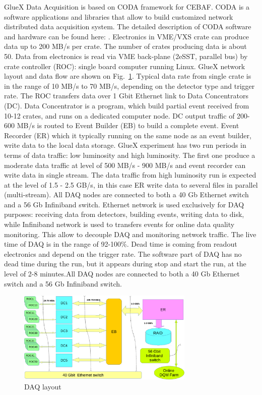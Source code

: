 GlueX Data Acquisition is based on CODA framework for CEBAF. CODA is a software applications and libraries that allow to build customized 
network distributed data acquisition system.
The detailed description of CODA software and hardware can be found here: \cite{CLASS12_DAQ}. 
Electronics in VME/VXS crate can produce data up to 200 MB/s per crate.
The number of crates producing data is about 50.
Data from electronics is read via VME back-plane (2eSST, parallel bus) by crate controller (ROC): single board computer running Linux.
GlueX network layout and data flow are shown on Fig.~\ref{fig:CODA}.
Typical data rate from single crate is in the range of 10 MB/s to 70 MB/s, depending on the detector type and trigger rate.
The ROC transfers data over 1 Gbit Ethernet link to Data Concentrators (DC).
Data Concentrator is a program, which build partial event received from 10-12 crates, and runs on a dedicated computer node.
DC output traffic of 200-600 MB/s is routed to Event Builder (EB) to build a complete event.
Event Recorder (ER) which it typically running on the same node as an event builder, write data to the local data storage. 
GlueX experiment has two run periods in terms of data traffic: low luminosity and high luminosity.
The first one produce a moderate data traffic at level of 500 MB/s - 900 MB/s and event recorder can write data in single stream. 
The data traffic from high luminosity run is expected at the level of 1.5 - 2.5 GB/s, in this case ER write data to several files in parallel (multi-stream).
All DAQ nodes are connected to both a 40 Gb Ethernet switch and a 56 Gb Infiniband switch.
Ethernet network is used exclusively for DAQ purposes: receiving data from detectors, building events, writing data to disk, 
while Infiniband network is used to transfers events for online data quality monitoring. 
This allow to decouple DAQ and monitoring network traffic.
The live time of DAQ is in the range of 92-100\%. Dead time is coming from readout electronics and depend on the trigger rate.  
The software part of DAQ has no dead time during the run, but it appears during stop and start the run, at the level of 2-8 minutes.All DAQ nodes are connected to both a 40 Gb Ethernet switch and a 56 Gb Infiniband switch.



\begin{figure}[tbp]
\begin{center}
\includegraphics[width=0.75\textwidth]{figures/DAQ_coda.pdf}  
\caption{ \label{fig:CODA}
DAQ layout}

\end{center}
\end{figure}
